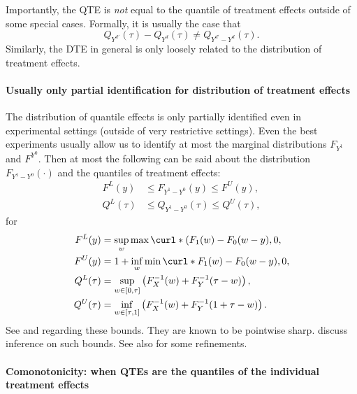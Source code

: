 Importantly, the QTE is \emph{not} equal to the quantile of treatment effects outside of some special cases. Formally, it is usually the case that 
\begin{equation}
	 Q_{Y^{d'}}(\tau) - 	Q_{Y^d}(\tau)  \neq Q_{Y^{d'}- Y^d}(\tau).
\end{equation}
Similarly, the DTE in general is only loosely related to the distribution of treatment effects. 


 
\paragraph{Usually only partial identification for distribution of treatment effects}

The distribution of quantile effects is only partially identified even in  experimental settings (outside of very restrictive settings). Even the best experiments usually allow us to identify at most the marginal   distributions $F_{Y^1}$ and $F^{Y^0}$. Then at most the following can be said about the distribution  $F_{Y^1-Y^0}(\cdot)$ and the quantiles of treatment effects:
\begin{align}
	F^L(y) & \leq F_{Y^1-Y^0}(y)\leq F^U(y),\\
	Q^L(\tau) & \leq Q_{Y^1-Y^0}(\tau) \leq Q^U(\tau),
\end{align} 
for
\begin{align}
	F^L(y) & = \sup_w \max\curl*{(F_1(w) - F_0(w-y), 0},\\
	F^U(y) & = 1+ \inf_w\min\curl*{F_1(w) - F_0(w-y), 0 },\\
			Q^L(\tau) & = \sup_{w\in [0, \tau]}\left( F_X^{-1}(w) + F_Y^{-1}(\tau-w) \right), \\
			 Q^U(\tau) & = \inf_{w\in [\tau, 1]} \left(F_X^{-1}(w)  + F^{-1}_Y(1+\tau-w)\right). \\
\end{align} See   \cite{Makarov1981} and \cite{Williamson1990} regarding these bounds. They are known to be pointwise sharp. \cite{Fan2010} discuss inference on such bounds. See also \cite{Firpo2019} for some refinements.



\paragraph{Comonotonicity: when   QTEs  are the quantiles of the individual treatment effects}



